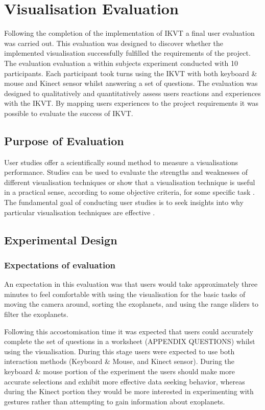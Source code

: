 \chapter{Visualisation Evaluation}\label{C:eval}
Following the completion of the implementation of IKVT a final
user evaluation was carried out. This evaluation was
 designed to discover whether the implemented visualisation
successfully fulfilled the requirements of the project. The evaluation
evaluation a within subjects experiment conducted with 10
participants. Each participant took turns using the IKVT with both keyboard \&
mouse and Kinect sensor whilst answering a set of questions.
The evaluation was designed to qualitatively and
quantitatively assess users
reactions and experiences with the IKVT. By mapping users experiences to the
project requirements it was possible to evaluate the success of IKVT.

\section{Purpose of Evaluation}
User studies offer a 
scientifically sound method to measure a visualisations 
performance. Studies can 
be used to evaluate the strengths and weaknesses of 
different visualisation techniques or show that a visualisation technique is 
useful in a practical sense, according to some objective 
criteria, for some specific task \cite{kosara2003thoughts}. 
The fundamental goal of conducting user studies is to 
seek insights into why particular visualisation techniques are effective
\cite{kosara2003thoughts}.


\section{Experimental Design}
\subsection{Expectations of evaluation}
An expectation in this evaluation was that users would take approximately three
minutes to feel comfortable with using the visualisation for the basic tasks of
moving the camera around, sorting the exoplanets, and using the range sliders to
filter the exoplanets. 

Following this accostomisation time it was expected that users could accurately
complete the set of questions in a worksheet (APPENDIX QUESTIONS) whilst using
the visualisation. During this stage users were expected to use both interaction
methods (Keyboard \& Mouse, and Kinect sensor). During the keyboard \& mouse
portion of the experiment the users should make more accurate selections and
exhibit more effective data seeking behavior, whereas during the Kinect portion
they would be more interested in experimenting with gestures rather than
attempting to gain information about exoplanets.

